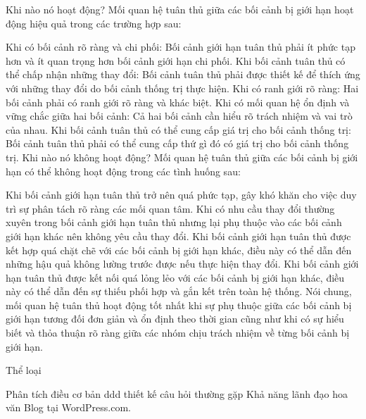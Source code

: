 Khi nào nó hoạt động?
Mối quan hệ tuân thủ giữa các bối cảnh bị giới hạn hoạt động hiệu quả trong các trường hợp sau:

Khi có bối cảnh rõ ràng và chi phối: Bối cảnh giới hạn tuân thủ phải ít phức tạp hơn và ít quan trọng hơn bối cảnh giới hạn chi phối.
Khi bối cảnh tuân thủ có thể chấp nhận những thay đổi: Bối cảnh tuân thủ phải được thiết kế để thích ứng với những thay đổi do bối cảnh thống trị thực hiện.
Khi có ranh giới rõ ràng: Hai bối cảnh phải có ranh giới rõ ràng và khác biệt.
Khi có mối quan hệ ổn định và vững chắc giữa hai bối cảnh: Cả hai bối cảnh cần hiểu rõ trách nhiệm và vai trò của nhau.
Khi bối cảnh tuân thủ có thể cung cấp giá trị cho bối cảnh thống trị: Bối cảnh tuân thủ phải có thể cung cấp thứ gì đó có giá trị cho bối cảnh thống trị.
Khi nào nó không hoạt động?
Mối quan hệ tuân thủ giữa các bối cảnh bị giới hạn có thể không hoạt động trong các tình huống sau:

Khi bối cảnh giới hạn tuân thủ trở nên quá phức tạp, gây khó khăn cho việc duy trì sự phân tách rõ ràng các mối quan tâm.
Khi có nhu cầu thay đổi thường xuyên trong bối cảnh giới hạn tuân thủ nhưng lại phụ thuộc vào các bối cảnh giới hạn khác nên không yêu cầu thay đổi.
Khi bối cảnh giới hạn tuân thủ được kết hợp quá chặt chẽ với các bối cảnh bị giới hạn khác, điều này có thể dẫn đến những hậu quả không lường trước được nếu thực hiện thay đổi.
Khi bối cảnh giới hạn tuân thủ được kết nối quá lỏng lẻo với các bối cảnh bị giới hạn khác, điều này có thể dẫn đến sự thiếu phối hợp và gắn kết trên toàn hệ thống.
Nói chung, mối quan hệ tuân thủ hoạt động tốt nhất khi sự phụ thuộc giữa các bối cảnh bị giới hạn tương đối đơn giản và ổn định theo thời gian cũng như khi có sự hiểu biết và thỏa thuận rõ ràng giữa các nhóm chịu trách nhiệm về từng bối cảnh bị giới hạn.


Thể loại

Phân tích
điều cơ bản
ddd
thiết kế
câu hỏi thường gặp
Khả năng lãnh đạo
hoa văn
Blog tại WordPress.com.
